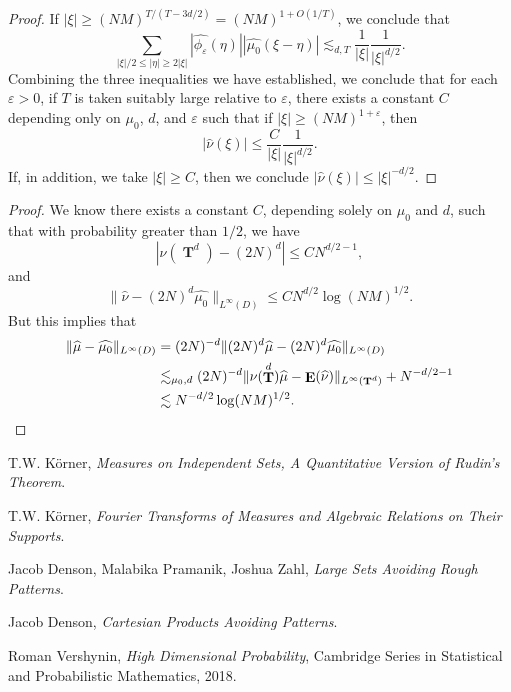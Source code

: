 \documentclass[12pt,reqno]{article}
\DeclareMathOperator{\TT}{\mathbf{T}}
\DeclareMathOperator{\EE}{\mathbf{E}}
\begin{document}
\begin{proof}
    If $|\xi| \geq (NM)^{T/(T - 3d/2)} = (NM)^{1 + O(1/T)}$, we conclude that
    \[ \sum_{|\xi|/2 \leq |\eta| \geq 2 |\xi|} |\widehat{\phi_\varepsilon}(\eta)| |\widehat{\mu_0}(\xi-\eta)| \lesssim_{d,T} \frac{1}{|\xi|} \frac{1}{|\xi|^{d/2}}. \]
    Combining the three inequalities we have established, we conclude that for each $\varepsilon > 0$, if $T$ is taken suitably large relative to $\varepsilon$, there exists a constant $C$ depending only on $\mu_0$, $d$, and $\varepsilon$ such that if $|\xi| \geq (NM)^{1 + \varepsilon}$, then
    \[ |\widehat{\nu}(\xi)| \leq \frac{C}{|\xi|} \frac{1}{|\xi|^{d/2}}. \]
    If, in addition, we take $|\xi| \geq C$, then we conclude $|\widehat{\nu}(\xi)| \leq |\xi|^{-d/2}$.
\end{proof}

\begin{proof}
    We know there exists a constant $C$, depending solely on $\mu_0$ and $d$, such that with probability greater than $1/2$, we have
    \[ |\nu(\TT^d) - (2N)^d| \leq C N^{d/2-1}, \]
    and
    \[ \| \widehat{\nu} - (2N)^d \widehat{\mu_0} \|_{L^\infty(D)} \leq C N^{d/2} \log(NM)^{1/2}. \]
    But this implies that
    \begin{align*}
        \| \widehat{\mu} - \widehat{\mu_0} \|_{L^\infty(D)} &= (2N)^{-d} \| (2N)^d \widehat{\mu} - (2N)^d \widehat{\mu_0} \|_{L^\infty(D)}\\
        &\lesssim_{\mu_0,d} (2N)^{-d} \| \nu(\TT^d) \widehat{\mu} - \EE(\widehat{\nu}) \|_{L^\infty(\TT^d)} + N^{-d/2-1} \\
        &\lesssim N^{-d/2} \log(NM)^{1/2}. \qedhere
    \end{align*}
\end{proof}

\begin{thebibliography}{9}

    T.W. K\"{o}rner,
    \textit{Measures on Independent Sets, A Quantitative Version of Rudin's Theorem}.

    T.W. K\"{o}rner,
    \textit{Fourier Transforms of Measures and Algebraic Relations on Their Supports}.

    Jacob Denson, Malabika Pramanik, Joshua Zahl,
    \textit{Large Sets Avoiding Rough Patterns}.

    Jacob Denson,
    \textit{Cartesian Products Avoiding Patterns}.

    Roman Vershynin,
    \textit{High Dimensional Probability},
    Cambridge Series in Statistical and Probabilistic Mathematics,
    2018.

\end{thebibliography}
\end{document}
